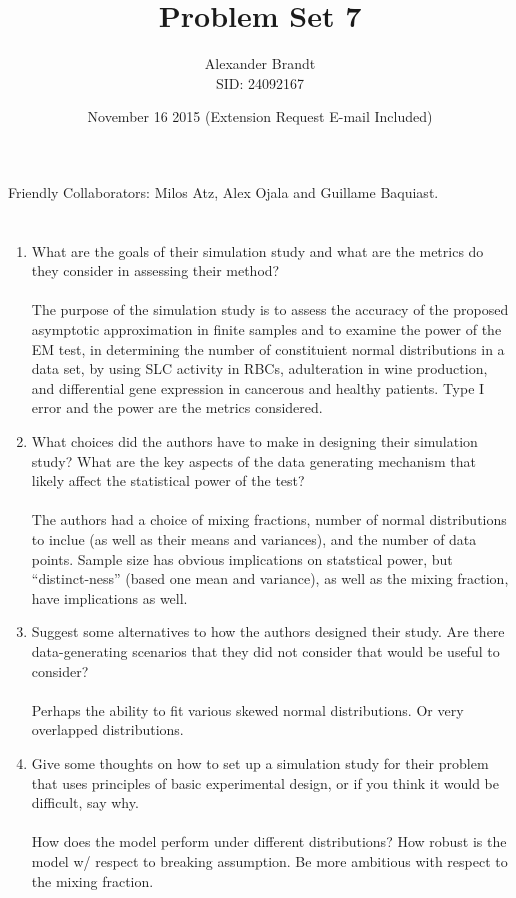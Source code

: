 \documentclass{article}\usepackage[]{graphicx}\usepackage[]{color}
\title{Problem Set 7}
\author{Alexander Brandt\\SID: 24092167}
\date{November 16 2015 (Extension Request E-mail Included)}
\begin{document}
\maketitle

Friendly Collaborators: Milos Atz, Alex Ojala and Guillame Baquiast.

\section{}

\begin{enumerate}

\item What are the goals of their simulation study and what are the metrics do they consider in assessing their method?
\\\\
The purpose of the simulation study is to assess the accuracy of the proposed asymptotic approximation in finite samples and to examine the power of the EM test, in determining the number of constituient normal distributions in a data set, by using SLC activity in RBCs, adulteration in wine production, and differential gene expression in cancerous and healthy patients.  Type I error and the power are the metrics considered.

\item What choices did the authors have to make in designing their simulation study?  What are the key aspects of the data generating mechanism that likely affect the statistical power of the test?
\\\\
The authors had a choice of mixing fractions, number of normal distributions to inclue (as well as their means and variances), and the number of data points.  Sample size has obvious implications on statstical power, but ``distinct-ness'' (based one mean and variance), as well as the mixing fraction, have implications as well.

\item Suggest some alternatives to how the authors designed their study.  Are there data-generating scenarios that they did not consider that would be useful to consider?
\\\\
Perhaps the ability to fit various skewed normal distributions.  Or very overlapped distributions.

\item Give some thoughts on how to set up a simulation study for their problem that uses principles of basic experimental design, or if you think it would be difficult, say why.
\\\\
How does the model perform under different distributions?  How robust is the model w/ respect to breaking assumption.  Be more ambitious with respect to the mixing fraction.


\end{enumerate}
\end{document}
